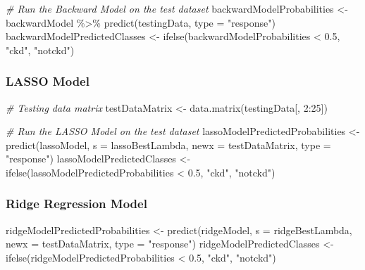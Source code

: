 \documentclass[
]{article}
\newenvironment{Shaded}{\begin{snugshade}}{\end{snugshade}}
\newcommand{\AttributeTok}[1]{\textcolor[rgb]{0.77,0.63,0.00}{#1}}
\newcommand{\CommentTok}[1]{\textcolor[rgb]{0.56,0.35,0.01}{\textit{#1}}}
\newcommand{\DecValTok}[1]{\textcolor[rgb]{0.00,0.00,0.81}{#1}}
\newcommand{\FloatTok}[1]{\textcolor[rgb]{0.00,0.00,0.81}{#1}}
\newcommand{\FunctionTok}[1]{\textcolor[rgb]{0.00,0.00,0.00}{#1}}
\newcommand{\NormalTok}[1]{#1}
\newcommand{\OtherTok}[1]{\textcolor[rgb]{0.56,0.35,0.01}{#1}}
\newcommand{\SpecialCharTok}[1]{\textcolor[rgb]{0.00,0.00,0.00}{#1}}
\newcommand{\StringTok}[1]{\textcolor[rgb]{0.31,0.60,0.02}{#1}}
\begin{document}
\begin{Shaded}
\begin{Highlighting}[]
\CommentTok{\# Run the Backward Model on the test dataset}
\NormalTok{backwardModelProbabilities }\OtherTok{\textless{}{-}}\NormalTok{ backwardModel }\SpecialCharTok{\%\textgreater{}\%} \FunctionTok{predict}\NormalTok{(testingData, }
    \AttributeTok{type =} \StringTok{"response"}\NormalTok{)}
\NormalTok{backwardModelPredictedClasses }\OtherTok{\textless{}{-}} \FunctionTok{ifelse}\NormalTok{(backwardModelProbabilities }\SpecialCharTok{\textless{}} \FloatTok{0.5}\NormalTok{, }
    \StringTok{"ckd"}\NormalTok{, }\StringTok{"notckd"}\NormalTok{)}
\end{Highlighting}
\end{Shaded}

\hypertarget{lasso-model}{%
\subsubsection{LASSO Model}\label{lasso-model}}

\begin{Shaded}
\begin{Highlighting}[]
\CommentTok{\# Testing data matrix}
\NormalTok{testDataMatrix }\OtherTok{\textless{}{-}} \FunctionTok{data.matrix}\NormalTok{(testingData[, }\DecValTok{2}\SpecialCharTok{:}\DecValTok{25}\NormalTok{])}

\CommentTok{\# Run the LASSO Model on the test dataset}
\NormalTok{lassoModelPredictedProbabilities }\OtherTok{\textless{}{-}} \FunctionTok{predict}\NormalTok{(lassoModel, }\AttributeTok{s =}\NormalTok{ lassoBestLambda, }
    \AttributeTok{newx =}\NormalTok{ testDataMatrix, }\AttributeTok{type =} \StringTok{"response"}\NormalTok{)}
\NormalTok{lassoModelPredictedClasses }\OtherTok{\textless{}{-}} \FunctionTok{ifelse}\NormalTok{(lassoModelPredictedProbabilities }\SpecialCharTok{\textless{}} \FloatTok{0.5}\NormalTok{, }
    \StringTok{"ckd"}\NormalTok{, }\StringTok{"notckd"}\NormalTok{)}
\end{Highlighting}
\end{Shaded}

\hypertarget{ridge-regression-model}{%
\subsubsection{Ridge Regression Model}\label{ridge-regression-model}}

\begin{Shaded}
\begin{Highlighting}[]
\NormalTok{ridgeModelPredictedProbabilities }\OtherTok{\textless{}{-}} \FunctionTok{predict}\NormalTok{(ridgeModel, }\AttributeTok{s =}\NormalTok{ ridgeBestLambda, }
    \AttributeTok{newx =}\NormalTok{ testDataMatrix, }\AttributeTok{type =} \StringTok{"response"}\NormalTok{)}
\NormalTok{ridgeModelPredictedClasses }\OtherTok{\textless{}{-}} \FunctionTok{ifelse}\NormalTok{(ridgeModelPredictedProbabilities }\SpecialCharTok{\textless{}} \FloatTok{0.5}\NormalTok{, }
    \StringTok{"ckd"}\NormalTok{, }\StringTok{"notckd"}\NormalTok{)}
\end{Highlighting}
\end{Shaded}
\end{document}
